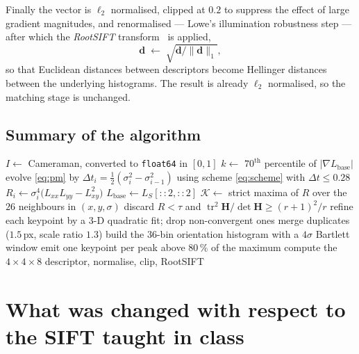 \documentclass[11pt,a4paper]{article}
\begin{document}
Finally the vector is $\ell_2$ normalised, clipped at $0.2$ to suppress the
effect of large gradient magnitudes, and renormalised --- Lowe's illumination
robustness step --- after which the \emph{RootSIFT}
transform~\cite{rootsift2012} is applied,
\begin{equation}
\mathbf{d}\;\leftarrow\;\sqrt{\mathbf{d}/\lVert\mathbf{d}\rVert_{1}} ,
\end{equation}
so that Euclidean distances between descriptors become Hellinger distances
between the underlying histograms. The result is already $\ell_2$ normalised,
so the matching stage is unchanged.

\subsection{Summary of the algorithm}

\begin{algorithm}[ht]
\caption{NDSS-SIFT}
\label{alg:main}
\begin{algorithmic}[1]
\State $I\gets$ Cameraman, converted to \texttt{float64} in $[0,1]$
  \State $k\gets$ $70^{\text{th}}$ percentile of $|\nabla L_{\text{base}}|$
    \State evolve \eqref{eq:pm} by $\Delta t_i=\tfrac12(\sigma_i^2-\sigma_{i-1}^2)$
           using scheme \eqref{eq:scheme} with $\Delta t\le0.28$
    \State $R_i\gets\sigma_i^{4}\bigl(L_{xx}L_{yy}-L_{xy}^{2}\bigr)$
  \EndFor
  \State $L_{\text{base}}\gets L_{S}[::2,::2]$ 
\EndFor
\State $\mathcal{K}\gets$ strict maxima of $R$ over the $26$ neighbours in $(x,y,\sigma)$
\State discard $R<\tau$ and $\operatorname{tr}^2\mathbf{H}/\det\mathbf{H}\ge(r{+}1)^2/r$
\State refine each keypoint by a $3$-D quadratic fit; drop non-convergent ones
\State merge duplicates ($1.5$\,px, scale ratio $1.3$)
  \State build the $36$-bin orientation histogram with a $4\sigma$ Bartlett window
  \State emit one keypoint per peak above $80\,\%$ of the maximum
  \State compute the $4\times4\times8$ descriptor, normalise, clip, RootSIFT
\EndFor
\end{algorithmic}
\end{algorithm}

\section{What was changed with respect to the SIFT taught in class}
\end{document}
